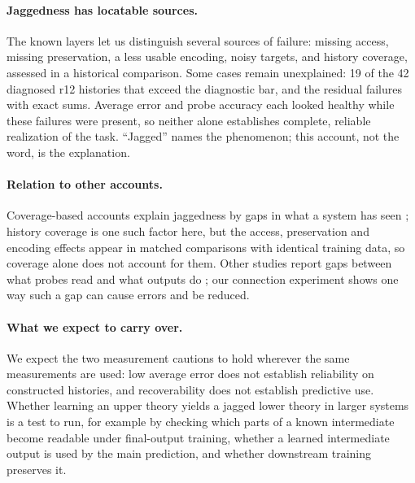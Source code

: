 \paragraph{Jaggedness has locatable sources.} The known layers let us
distinguish several sources of failure: missing access, missing
preservation, a less usable encoding, noisy targets, and history coverage,
assessed in a historical comparison. Some cases remain unexplained: 19 of the 42 diagnosed
r12 histories that exceed the diagnostic bar, and the residual failures with
exact sums. Average error and probe accuracy each looked healthy while these
failures were present, so neither alone establishes complete, reliable
realization of the task. ``Jagged'' names the phenomenon; this account, not the
word, is the explanation.

\paragraph{Relation to other accounts.} Coverage-based accounts explain
jaggedness by gaps in what a system has seen \citep{gans2026}; history
coverage is one such factor here, but the access, preservation and encoding
effects appear in matched comparisons with identical training data, so
coverage alone does not account for them. Other studies report gaps between
what probes read and what outputs do \citep{basu2026,darade2026}; our
connection experiment shows one way such a gap can cause errors and be
reduced.

\paragraph{What we expect to carry over.} We expect the two measurement
cautions to hold wherever the same measurements are used: low average error
does not establish reliability on constructed histories, and recoverability
does not establish predictive use. Whether learning an upper theory yields a
jagged lower theory in larger systems is a test to run, for example by
checking which parts of a known intermediate become readable under
final-output training, whether a learned intermediate output is used by the
main prediction, and whether downstream training preserves it.
